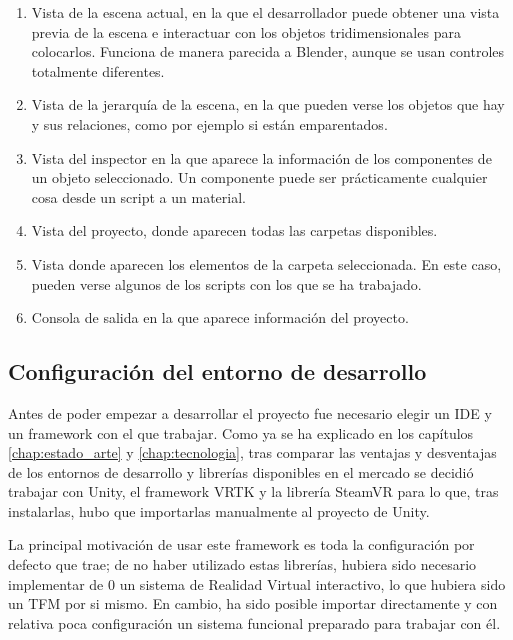 \begin{enumerate}
    \item Vista de la escena actual, en la que el desarrollador puede obtener una vista previa de la escena e interactuar con los objetos tridimensionales para colocarlos. Funciona de manera parecida a Blender, aunque se usan controles totalmente diferentes.
    
    \item Vista de la jerarquía de la escena, en la que pueden verse los objetos que hay y sus relaciones, como por ejemplo si están emparentados.
    
    \item Vista del inspector en la que aparece la información de los componentes de un objeto seleccionado. Un componente puede ser prácticamente cualquier cosa desde un script a un material.
    
    \item Vista del proyecto, donde aparecen todas las carpetas disponibles.
    
    \item Vista donde aparecen los elementos de la carpeta seleccionada. En este caso, pueden verse algunos de los scripts con los que se ha trabajado.
    
    \item Consola de salida en la que aparece información del proyecto.
\end{enumerate}

\subsection{Configuración del entorno de desarrollo}

Antes de poder empezar a desarrollar el proyecto fue necesario elegir un \acs{IDE} y un framework con el que trabajar. Como ya se ha explicado en los capítulos \ref{chap:estado_arte} y \ref{chap:tecnologia}, tras comparar las ventajas y desventajas de los entornos de desarrollo y librerías disponibles en el mercado se decidió trabajar con Unity, el framework \acs{VRTK} y la librería SteamVR para lo que, tras instalarlas, hubo que importarlas manualmente al proyecto de Unity.

La principal motivación de usar este framework es toda la configuración por defecto que trae; de no haber utilizado estas librerías, hubiera sido necesario implementar de 0 un sistema de Realidad Virtual interactivo, lo que hubiera sido un \acs{TFM} por si mismo. En cambio, ha sido posible importar directamente y con relativa poca configuración un sistema funcional preparado para trabajar con él.

